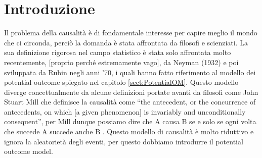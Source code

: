 \chapter{Introduzione}
\label{sect:History Causality}
Il problema della causalità è di fondamentale interesse per capire meglio il mondo che ci circonda, perciò la domanda è stata affrontata da  filosofi e scienziati. La sua definizione rigorosa nel campo statistico è stata solo affrontata molto recentemente, [proprio perché estremamente vago], da Neyman (1932) e poi sviluppata da Rubin negli anni '70, i quali hanno fatto riferimento al modello dei potential outcome spiegato nel capitolo \ref{sect:PotentialOM}. Questo modello diverge concettualmente da alcune definizioni portate avanti da  filosofi come John Stuart Mill che definisce la causalità come “the antecedent, or the concurrence of antecedents, on which [a given phenomenon] is invariably and unconditionally consequent”, per Mill dunque possiamo dire che A causa B se e solo se ogni volta che succede A succede anche B . Questo modello di causalità è molto riduttivo e ignora la aleatorietà degli eventi, per questo dobbiamo introdurre il potential outcome model. 
